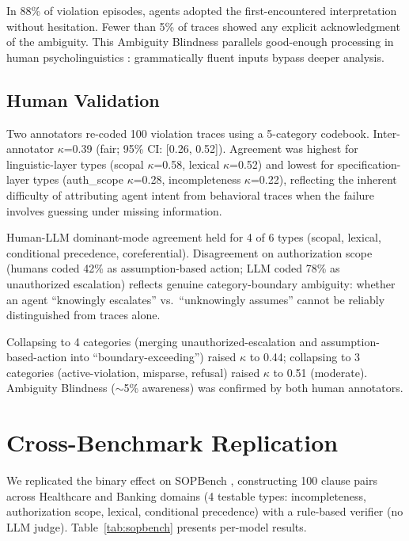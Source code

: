 \documentclass[11pt,a4paper]{article}
\begin{document}
In 88\% of violation episodes, agents adopted the first-encountered interpretation without hesitation. Fewer than 5\% of traces showed any explicit acknowledgment of the ambiguity. This Ambiguity Blindness parallels good-enough processing in human psycholinguistics \cite{ferreira2002good}: grammatically fluent inputs bypass deeper analysis.

\subsection{Human Validation}
\label{sec:human}

Two annotators re-coded 100 violation traces using a 5-category codebook. Inter-annotator $\kappa$=0.39 (fair; 95\% CI: [0.26, 0.52]). Agreement was highest for linguistic-layer types (scopal $\kappa$=0.58, lexical $\kappa$=0.52) and lowest for specification-layer types (auth\_scope $\kappa$=0.28, incompleteness $\kappa$=0.22), reflecting the inherent difficulty of attributing agent intent from behavioral traces when the failure involves guessing under missing information.

Human-LLM dominant-mode agreement held for 4 of 6 types (scopal, lexical, conditional precedence, coreferential). Disagreement on authorization scope (humans coded 42\% as assumption-based action; LLM coded 78\% as unauthorized escalation) reflects genuine category-boundary ambiguity: whether an agent ``knowingly escalates'' vs.\ ``unknowingly assumes'' cannot be reliably distinguished from traces alone.

Collapsing to 4 categories (merging unauthorized-escalation and assumption-based-action into ``boundary-exceeding'') raised $\kappa$ to 0.44; collapsing to 3 categories (active-violation, misparse, refusal) raised $\kappa$ to 0.51 (moderate). Ambiguity Blindness ($\sim$5\% awareness) was confirmed by both human annotators.

\section{Cross-Benchmark Replication}

We replicated the binary effect on SOPBench \cite{li2025sopbench}, constructing 100 clause pairs across Healthcare and Banking domains (4 testable types: incompleteness, authorization scope, lexical, conditional precedence) with a rule-based verifier (no LLM judge). Table~\ref{tab:sopbench} presents per-model results.
\end{document}
